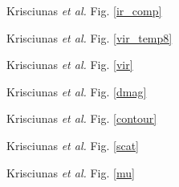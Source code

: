 \documentclass[12pt,preprint,psfig,epsf]{aastex}
\begin{document}
\begin{figure}
{\center Krisciunas {\it et al.} Fig. \ref{ir_comp}}
\end{figure}

\begin{figure}
{\center Krisciunas {\it et al.} Fig. \ref{vir_temp8}}
\end{figure}

\begin{figure}
{\center Krisciunas {\it et al.} Fig. \ref{vir}}
\end{figure}

\begin{figure}
{\center Krisciunas {\it et al.} Fig. \ref{dmag}}
\end{figure}

\begin{figure}
{\center Krisciunas {\it et al.} Fig. \ref{contour}}
\end{figure}

\begin{figure}
{\center Krisciunas {\it et al.} Fig. \ref{scat}}
\end{figure}

\begin{figure}
{\center Krisciunas {\it et al.} Fig. \ref{mu}}
\end{figure}
\end{document}
